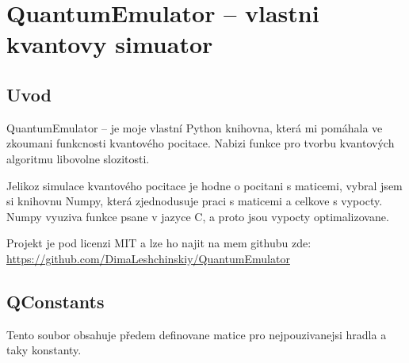 \documentclass[11pt]{article}
\begin{document}
\section{QuantumEmulator – vlastni kvantovy simuator}
\subsection{Uvod}
QuantumEmulator – je moje vlastní Python knihovna, která mi pomáhala ve zkoumani funkcnosti kvantového pocitace.
Nabizi funkce pro tvorbu kvantových algoritmu libovolne slozitosti.
\par Jelikoz simulace kvantového pocitace je hodne o pocitani s maticemi, vybral jsem si knihovnu Numpy, která zjednodusuje praci s maticemi a celkove s vypocty.
Numpy vyuziva funkce psane v jazyce C, a proto jsou vypocty optimalizovane.
\par Projekt je pod licenzi MIT a lze ho najit na mem githubu zde: \url{https://github.com/DimaLeshchinskiy/QuantumEmulator}

\subsection{QConstants}
Tento soubor obsahuje předem definovane matice pro nejpouzivanejsi hradla a taky konstanty.
\end{document}
